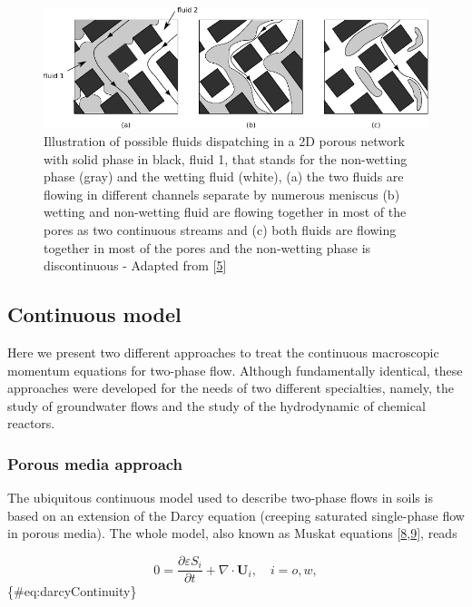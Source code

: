 \documentclass[]{article}
\begin{document}
\begin{figure}
\hypertarget{fig:fluidPatterns}{%
\centering
\includegraphics{figures/pdf/dessin.pdf}
\caption{Illustration of possible fluids dispatching in a 2D porous
network with solid phase in black, fluid 1, that stands for the
non-wetting phase (gray) and the wetting fluid (white), (a) the two
fluids are flowing in different channels separate by numerous meniscus
(b) wetting and non-wetting fluid are flowing together in most of the
pores as two continuous streams and (c) both fluids are flowing together
in most of the pores and the non-wetting phase is discontinuous -
Adapted from
{[}\protect\hyperlink{ref-dullien2012porous}{5}{]}}\label{fig:fluidPatterns}
}
\end{figure}

\hypertarget{continuous-model}{%
\subsection{Continuous model}\label{continuous-model}}

Here we present two different approaches to treat the continuous
macroscopic momentum equations for two-phase flow. Although
fundamentally identical, these approaches were developed for the needs
of two different specialties, namely, the study of groundwater flows and
the study of the hydrodynamic of chemical reactors.

\hypertarget{porous-media-approach}{%
\subsubsection{Porous media approach}\label{porous-media-approach}}

The ubiquitous continuous model used to describe two-phase flows in
soils is based on an extension of the Darcy equation (creeping saturated
single-phase flow in porous media). The whole model, also known as
Muskat equations
{[}\protect\hyperlink{ref-wyckoff1936flow}{8},\protect\hyperlink{ref-muskat1938flow}{9}{]},
reads

\[
0=\frac{\partial\varepsilon S_{i}}{\partial t}+\nabla\cdot\mathbf{U}_{i},\quad i=o,w,
\] \{\#eq:darcyContinuity\}
\end{document}

